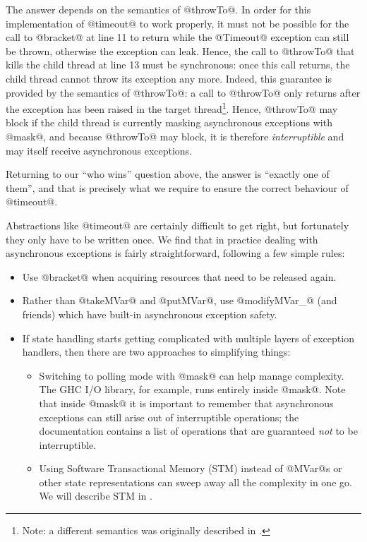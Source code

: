 The answer depends on the semantics of @throwTo@.  In order for this
implementation of @timeout@ to work properly, it must not be possible
for the call to @bracket@ at line 11 to return while the @Timeout@
exception can still be thrown, otherwise the exception can leak.
Hence, the call to @throwTo@ that kills the child thread at line 13
must be synchronous: once this call returns, the child thread cannot
throw its exception any more.  Indeed, this guarantee is provided by
the semantics of @throwTo@: a call to @throwTo@ only returns after the
exception has been raised in the target thread\footnote{Note: a
  different semantics was originally described in
  \citet{spj:asynch-exceptions}.}.  Hence, @throwTo@ may block if the
child thread is currently masking asynchronous exceptions with @mask@,
and because @throwTo@ may block, it is therefore \emph{interruptible}
and may itself receive asynchronous exceptions.

Returning to our ``who wins'' question above, the answer is ``exactly
one of them'', and that is precisely what we require to ensure the
correct behaviour of @timeout@.


Abstractions like @timeout@ are certainly difficult to get right, but
fortunately they only have to be written once.  We find that in
practice dealing with asynchronous exceptions is fairly
straightforward, following a few simple rules:

\begin{itemize}
\item Use @bracket@ when acquiring resources that need to be released
  again.
\item Rather than @takeMVar@ and @putMVar@, use @modifyMVar_@ (and
  friends) which have built-in asynchronous exception safety.
\item If state handling starts getting complicated with multiple
  layers of exception handlers, then there are two approaches to
  simplifying things:
  \begin{itemize}
    \item Switching to polling mode with @mask@ can help manage
      complexity.  The GHC I/O library, for example, runs entirely
      inside @mask@.  Note that inside @mask@ it is important to
      remember that asynchronous exceptions can still arise out of
      interruptible operations; the documentation contains a list of
      operations that are guaranteed \emph{not} to be interruptible.
    \item Using Software Transactional Memory (STM) instead of @MVar@s
      or other state representations can sweep away all the complexity
      in one go.  We will describe STM in .
  \end{itemize}
\end{itemize}

